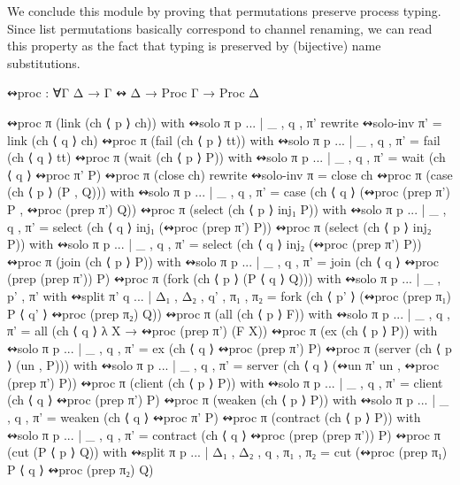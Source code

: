 We conclude this module by proving that permutations preserve process typing. Since
list permutations basically correspond to channel renaming, we can read this
property as the fact that typing is preserved by (bijective) name substitutions.

\begin{code}
↭proc : ∀{Γ Δ} → Γ ↭ Δ → Proc Γ → Proc Δ
\end{code}
\begin{code}[hide]
↭proc π (link (ch ⟨ p ⟩ ch)) with ↭solo π p
... | _ , q , π' rewrite ↭solo-inv π' = link (ch ⟨ q ⟩ ch)
↭proc π (fail (ch ⟨ p ⟩ tt)) with ↭solo π p
... | _ , q , π' = fail (ch ⟨ q ⟩ tt)
↭proc π (wait (ch ⟨ p ⟩ P)) with ↭solo π p
... | _ , q , π' = wait (ch ⟨ q ⟩ ↭proc π' P)
↭proc π (close ch) rewrite ↭solo-inv π = close ch
↭proc π (case (ch ⟨ p ⟩ (P , Q))) with ↭solo π p
... | _ , q , π' = case (ch ⟨ q ⟩ (↭proc (prep π') P , ↭proc (prep π') Q))
↭proc π (select (ch ⟨ p ⟩ inj₁ P)) with ↭solo π p
... | _ , q , π' = select (ch ⟨ q ⟩ inj₁ (↭proc (prep π') P))
↭proc π (select (ch ⟨ p ⟩ inj₂ P)) with ↭solo π p
... | _ , q , π' = select (ch ⟨ q ⟩ inj₂ (↭proc (prep π') P))
↭proc π (join (ch ⟨ p ⟩ P)) with ↭solo π p
... | _ , q , π' = join (ch ⟨ q ⟩ ↭proc (prep (prep π')) P)
↭proc π (fork (ch ⟨ p ⟩ (P ⟨ q ⟩ Q))) with ↭solo π p
... | _ , p' , π' with ↭split π' q
... | Δ₁ , Δ₂ , q' , π₁ , π₂ = fork (ch ⟨ p' ⟩ (↭proc (prep π₁) P ⟨ q' ⟩ ↭proc (prep π₂) Q))
↭proc π (all (ch ⟨ p ⟩ F)) with ↭solo π p
... | _ , q , π' = all (ch ⟨ q ⟩ λ X → ↭proc (prep π') (F X))
↭proc π (ex (ch ⟨ p ⟩ P)) with ↭solo π p
... | _ , q , π' = ex (ch ⟨ q ⟩ ↭proc (prep π') P)
↭proc π (server (ch ⟨ p ⟩ (un , P))) with ↭solo π p
... | _ , q , π' = server (ch ⟨ q ⟩ (↭un π' un , ↭proc (prep π') P))
↭proc π (client (ch ⟨ p ⟩ P)) with ↭solo π p
... | _ , q , π' = client (ch ⟨ q ⟩ ↭proc (prep π') P)
↭proc π (weaken (ch ⟨ p ⟩ P)) with ↭solo π p
... | _ , q , π' = weaken (ch ⟨ q ⟩ ↭proc π' P)
↭proc π (contract (ch ⟨ p ⟩ P)) with ↭solo π p
... | _ , q , π' = contract (ch ⟨ q ⟩ ↭proc (prep (prep π')) P)
↭proc π (cut (P ⟨ p ⟩ Q)) with ↭split π p
... | Δ₁ , Δ₂ , q , π₁ , π₂ = cut (↭proc (prep π₁) P ⟨ q ⟩ ↭proc (prep π₂) Q)
\end{code}
